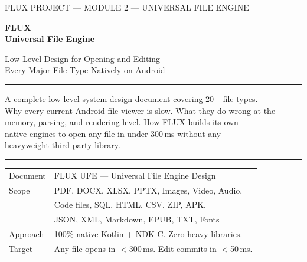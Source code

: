 \documentclass[11pt, a4paper, openright]{report}
\begin{document}
\color{ink}

\begin{titlepage}
\thispagestyle{empty}

\vspace*{8mm}
{\fontsize{9}{11}\selectfont\textcolor{light}{\MakeUppercase{FLUX Project --- Module 2 --- Universal File Engine}}}

\vspace{18mm}
{\fontsize{38}{42}\selectfont\bfseries\color{ink}FLUX\\[4pt]Universal File Engine}

\vspace{5mm}
{\fontsize{16}{20}\selectfont\color{ink}
  Low-Level Design for Opening and Editing\\
  Every Major File Type Natively on Android
}

\vspace{6mm}
\textcolor{rule}{\rule{\linewidth}{1.2pt}}
\vspace{6mm}

{\fontsize{12}{16}\selectfont\color{mid}
  A complete low-level system design document covering 20+ file types.\\[4pt]
  Why every current Android file viewer is slow. What they do wrong at the\\
  memory, parsing, and rendering level. How FLUX builds its own\\
  native engines to open any file in under 300\,ms without any\\
  heavyweight third-party library.
}

\vspace{14mm}
\textcolor{rule}{\rule{\linewidth}{0.4pt}}
\vspace{10mm}

\begin{tabular}{@{}p{55mm}p{80mm}@{}}
  \small\textcolor{light}{Document} & \small FLUX UFE --- Universal File Engine Design \\[4pt]
  \small\textcolor{light}{Scope}    & \small PDF, DOCX, XLSX, PPTX, Images, Video, Audio, \\
                                     & \small Code files, SQL, HTML, CSV, ZIP, APK, \\
                                     & \small JSON, XML, Markdown, EPUB, TXT, Fonts \\[4pt]
  \small\textcolor{light}{Approach} & \small 100\% native Kotlin + NDK C. Zero heavy libraries. \\[4pt]
  \small\textcolor{light}{Target}   & \small Any file opens in $<$300\,ms. Edit commits in $<$50\,ms. \\
\end{tabular}

\restoregeometry
\end{titlepage}
\end{document}
